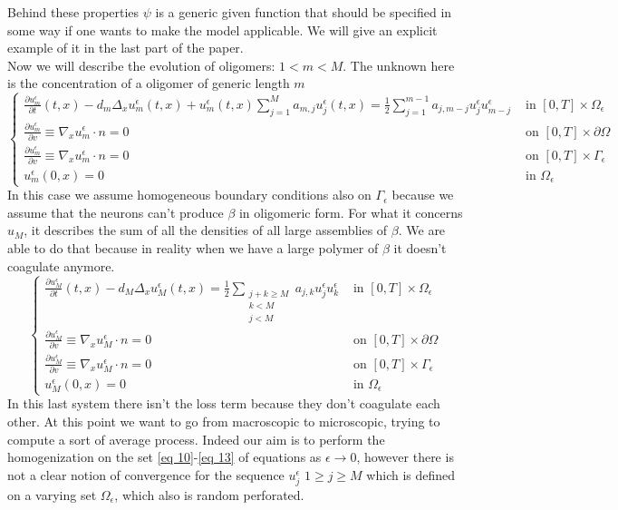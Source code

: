Behind these properties $\psi $ is a generic given function that should be specified in some way if one wants to make the model applicable. We will give an explicit example of it in the last part of the paper.\\
Now we will describe the evolution of oligomers: $1<m<M$. The unknown here is the concentration of a oligomer of generic length $m$
\begin{equation}
    \begin{cases}
        \frac{\partial u_{m}^{\epsilon}}{\partial t}(t, x)-d_{m} \Delta_{x} u_{m}^{\epsilon}(t, x)+u_{m}^{\epsilon}(t, x) \sum_{j=1}^{M} a_{m, j} u_{j}^{\epsilon}(t, x)= \frac{1}{2} \sum_{j=1}^{m-1} a_{j, m-j} u_{j}^{\epsilon} u_{m-j}^{\epsilon} & \text { in }[0, T] \times \Omega_{\epsilon} \\
        \frac{\partial u_{m}^{\epsilon}}{\partial v} \equiv \nabla_{x} u_{m}^{\epsilon} \cdot n=0  & \text { on }[0, T] \times \partial \Omega \\
        \frac{\partial u_{m}^{\epsilon}}{\partial v} \equiv \nabla_{x} u_{m}^{\epsilon} \cdot n=0 & \text { on }[0, T] \times \Gamma_{\epsilon}\\ 
     u_{m}^{\epsilon}(0, x)=0 & \text{ in } \Omega_{\epsilon}
    \end{cases}
\label{eq 12}\end{equation}
In this case we assume homogeneous boundary conditions also on $\Gamma_{\epsilon}$ because we assume that the neurons can't produce \(\beta\) in oligomeric form.
For what it concerns $u_{M}$, it describes the sum of all the densities of all large assemblies of \(\beta\). We are able to do that because in reality when we have a large polymer of \(\beta\) it doesn't  coagulate anymore. 
\begin{equation}
    \begin{cases}
        \frac{\partial u_{M}^{\epsilon}}{\partial t}(t, x)-d_{M} \Delta_{x} u_{M}^{\epsilon}(t, x)= \frac{1}{2} \sum_{\substack{j+k\geq M\\k<M\\j<M}} a_{j, k} u_{j}^{\epsilon} u_{k}^{\epsilon} & \text { in }[0, T] \times \Omega_{\epsilon}\\
        \frac{\partial u_{M}^{\epsilon}}{\partial v} \equiv \nabla_{x} u_{M}^{\epsilon} \cdot n=0  & \text { on }[0, T] \times \partial \Omega
        \\
        \frac{\partial u_{M}^{\epsilon}}{\partial v} \equiv \nabla_{x} u_{M}^{\epsilon} \cdot n=0 & \text { on }[0, T] \times \Gamma_{\epsilon}\\ 
        u_{M}^{\epsilon}(0, x)=0 & \text{ in } \Omega_{\epsilon}
    \end{cases}
    \label{eq 13}
\end{equation}
In this last system there isn't the loss term because they don't coagulate each other.
At this point we want to go from macroscopic to microscopic, trying to compute a sort of average process. Indeed our aim is to perform the homogenization on the set \eqref{eq 10}-\eqref{eq 13} of equations as $\epsilon \rightarrow 0$, however there is not a clear notion of convergence for the sequence $u_j^{\epsilon}$ $1\geq j \geq M$ which is defined on a varying set $\Omega_{\epsilon}$, which also is random perforated.

